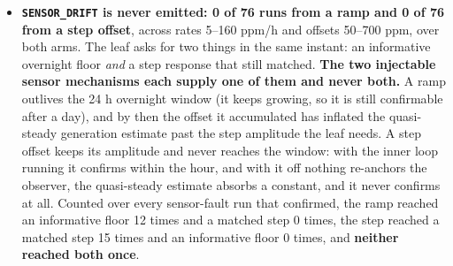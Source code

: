 \begin{itemize}
\item \textbf{\texttt{SENSOR\_DRIFT} is never emitted: 0 of 76 runs from a ramp and 0 of 76 from a
step offset}, across rates 5--160 ppm/h and offsets 50--700 ppm, over both arms. The leaf asks for
two things in the same instant: an informative overnight floor \emph{and} a step response that still
matched. \textbf{The two injectable sensor mechanisms each supply one of them and never both.} A
ramp outlives the 24 h overnight window (it keeps growing, so it is still confirmable after a day),
and by then the offset it accumulated has inflated the quasi-steady generation estimate past the
step amplitude the leaf needs. A step offset keeps its amplitude and never reaches the window: with
the inner loop running it confirms within the hour, and with it off nothing re-anchors the observer,
the quasi-steady estimate absorbs a constant, and it never confirms at all. Counted over every
sensor-fault run that confirmed, the ramp reached an informative floor 12 times and a matched step 0
times, the step reached a matched step 15 times and an informative floor 0 times, and
\textbf{neither reached both once}.


\end{itemize}
